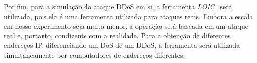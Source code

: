 Por fim, para a simulação do ataque DDoS em si, a ferramenta \emph{LOIC}~\cite{loic} será utilizada, pois ela é uma ferramenta utilizada para ataques reais. Embora a escala em nosso experimento seja muito menor, a operação será baseada em um ataque real e, portanto, condizente com a realidade. Para a obtenção de diferentes endereços IP, diferenciando um DoS de um DDoS, a ferramenta será utilizada simultaneamente por computadores de endereços diferentes.